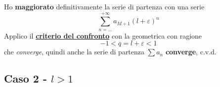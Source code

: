 \documentclass[../dimostrazioni]{subfiles}
\begin{document}
                Ho \textbf{maggiorato} definitivamente la serie di partenza con una serie
                \[ \sum_{n=\dots}^{+\infty} a_{M+1}(l + \varepsilon)^{n}\] 
                Applico il \textbf{\hyperref[serieconfronto]{criterio del confronto}} con la geometrica con ragione
                \[-1 < q = l + \varepsilon < 1 \]
                che \emph{converge}, quindi anche la serie di partenza \(\sum a_n \) \textbf{converge}, c.v.d.

            \subsection*{Caso 2 - \(l > 1\)}
                
                
                
\end{document}
